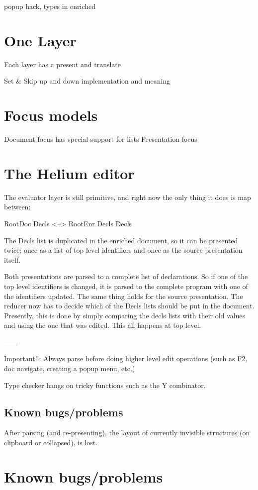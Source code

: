 \documentclass[]{article}
\begin{document}
popup hack, types in enriched

\section{One Layer}
Each layer has a present and translate

Set \& Skip up and down
implementation and meaning
 

\section{Focus models}

Document focus has special support for lists
Presentation focus

\section{The Helium editor}

The evaluator layer is still primitive, and right now the only thing it does is map between:

RootDoc Decls   <-->  RootEnr Decls Decls

The Decls list is duplicated in the enriched document, so it can be presented twice; once as a list of top level identifiers and once as the source presentation itself.

Both presentations are parsed to a complete list of declarations. So if one of the top level identifiers is changed, it is parsed to the complete program with one of the identifiers updated. The same thing holds for the source presentation. The reducer now has to decide which of the Decls lists should be put in the document. Presently, this is done by simply comparing the decls lists with their old values and using the one that was edited. This all happens at top level.


------

Important!!: Always parse before doing higher level edit operations (such as F2, doc navigate, creating a popup menu, etc.)

Type checker hangs on tricky functions such as the Y combinator.


\subsection{Known bugs/problems}
After parsing (and re-presenting), the layout of currently invisible structures (on clipboard or collapsed), is lost.

\section{Known bugs/problems}
\end{document}
